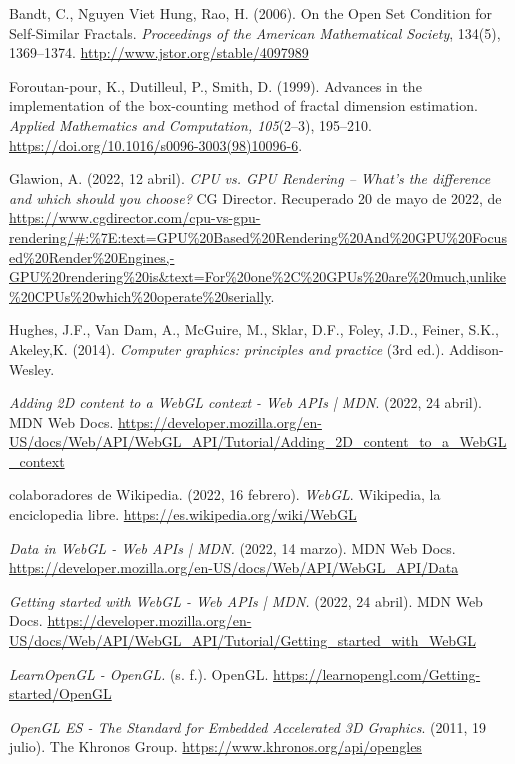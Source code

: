 \begin{thebibliography}{99}
 Bandt, C., Nguyen Viet Hung, Rao, H. (2006). On the Open Set Condition for Self-Similar Fractals. \textit{Proceedings of the American Mathematical Society}, 134(5), 1369–1374. \url{http://www.jstor.org/stable/4097989}


 Foroutan-pour, K., Dutilleul, P., Smith, D. (1999). Advances in the implementation of the box-counting method of fractal dimension estimation. \textit{Applied Mathematics and Computation, 105}(2–3), 195–210. \url{https://doi.org/10.1016/s0096-3003(98)10096-6}.

 Glawion, A. (2022, 12 abril). \textit{CPU vs. GPU Rendering – What’s the difference and which should you choose?} CG Director. Recuperado 20 de mayo de 2022, de \url{https://www.cgdirector.com/cpu-vs-gpu-rendering/#:%7E:text=GPU%20Based%20Rendering%20And%20GPU%20Focused%20Render%20Engines,-GPU%20rendering%20is&text=For%20one%2C%20GPUs%20are%20much,unlike%20CPUs%20which%20operate%20serially}.

 Hughes, J.F., Van Dam, A., McGuire, M., Sklar, D.F., Foley, J.D., Feiner, S.K., Akeley,K. (2014). \textit{Computer graphics: principles and practice} (3rd ed.). Addison-Wesley.


 \textit{Adding 2D content to a WebGL context - Web APIs | MDN}. (2022, 24 abril). MDN Web Docs. \url{https://developer.mozilla.org/en-US/docs/Web/API/WebGL_API/Tutorial/Adding_2D_content_to_a_WebGL_context}

 colaboradores de Wikipedia. (2022, 16 febrero). \textit{WebGL}. Wikipedia, la enciclopedia libre. \url{https://es.wikipedia.org/wiki/WebGL}



 \textit{Data in WebGL - Web APIs | MDN.} (2022, 14 marzo). MDN Web Docs. \url{https://developer.mozilla.org/en-US/docs/Web/API/WebGL_API/Data}

 \textit{Getting started with WebGL - Web APIs | MDN.} (2022, 24 abril). MDN Web Docs. \url{https://developer.mozilla.org/en-US/docs/Web/API/WebGL_API/Tutorial/Getting_started_with_WebGL}

 \textit{LearnOpenGL - OpenGL.} (s. f.). OpenGL. \url{https://learnopengl.com/Getting-started/OpenGL}

 \textit{OpenGL ES - The Standard for Embedded Accelerated 3D Graphics}. (2011, 19 julio). The Khronos Group. \url{https://www.khronos.org/api/opengles}


\end{thebibliography}
